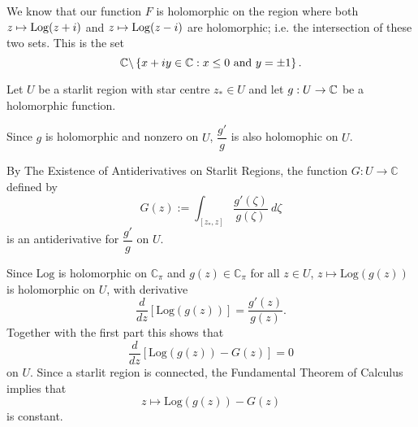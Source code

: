 \begin{questions}
\begin{answer}
We know that our function $F$ is holomorphic on the region where both $z \mapsto \operatorname{Log} ( z+i)$ and $z \mapsto \operatorname{Log} (z-i)$ are holomorphic; i.e. the intersection of these two sets. This is the set
\[
 \mathbb{C} \backslash \left\{ x+iy \in \mathbb{C}: x \leq 0 \text{ and } y= \pm 1 \right\}.
\]

\end{answer}
\question Let $U$ be a starlit region with star centre $z_* \in U$ and  let $g:U \to \mathbb{C}$ be a holomorphic function.
\begin{answer}
Since $g$ is holomorphic and nonzero on $U$, $\dfrac{g'}{g}$ is also holomophic on $U$.

By The Existence of Antiderivatives on Starlit Regions, the function $G:U \to \mathbb{C}$ defined by
\[
G(z):= \int_{[z_*,z]} \frac{g'(\zeta)}{g(\zeta)}\ d\zeta
\]
is an antiderivative for $\dfrac{g'}{g}$ on $U$.

Since $\mathrm{Log}$ is holomorphic on $\mathbb{C}_{\pi}$ and $g(z) \in \mathbb{C}_{\pi}$ for all $z \in U$, $z \mapsto \mathrm{Log} (g(z))$ is holomorphic on $U$, with derivative
\[
\frac{d}{dz} \left[ \mathrm{Log} (g(z)) \right] = \frac{g'(z)}{g(z)}.
\]
Together with the first part this shows that
\[
\frac{d}{dz} \left[ \mathrm{Log} (g(z)) - G(z) \right] = 0
\]
on $U$. Since a starlit region is connected, the Fundamental Theorem of Calculus implies that
\[
z \mapsto \mathrm{Log} (g(z)) - G(z) 
\]
is constant.
\end{answer}


\end{questions}
